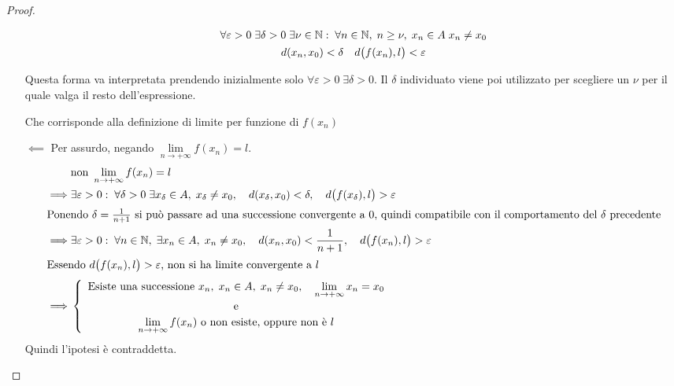 \begin{proposition}
\begin{proof}
\begin{itemize}
				\begin{equation*}
					\begin{gathered}
						\forall \varepsilon > 0\; \exists \delta > 0\; \exists \nu \in \mathbb{N}:\; \forall n \in \mathbb{N},\; n \geq \nu,\; x_n \in A\; x_n \neq x_0\\
						d(x_n, x_0) < \delta \quad d\bigl(f(x_n), l\bigr) < \varepsilon
					\end{gathered}
				\end{equation*}
				\begin{note}
					Questa forma va interpretata prendendo inizialmente solo $\forall \varepsilon > 0\; \exists \delta > 0$. Il $\delta$ individuato viene poi utilizzato per scegliere un $\nu$ per il quale valga il resto dell'espressione.
				\end{note}
				Che corrisponde alla definizione di limite per funzione di $f(x_n)$
			\item[$\impliedby$] Per assurdo, negando $\lim\limits_{n \to +\infty} f(x_n) = l$.
				\begin{align*}
					&\text{non } \lim\limits_{n \to +\infty} f(x_n) = l\\
					\implies & \exists \varepsilon > 0:\; \forall \delta > 0\; \exists x_\delta \in A,\; x_\delta \neq x_0, \quad d(x_\delta, x_0) < \delta, \quad d \bigl( f(x_\delta), l \bigr) > \varepsilon\\
					\intertext{Ponendo $\delta = \frac{1}{n+1}$ si può passare ad una successione convergente a $0$, quindi compatibile con il comportamento del $\delta$ precedente}
					\implies & \exists \varepsilon > 0:\; \forall n \in \mathbb{N},\; \exists x_n \in A,\; x_n \neq x_0, \quad d(x_n, x_0) < \frac{1}{n+1}, \quad d \bigl( f(x_n), l \bigr) > \varepsilon\\
					\intertext{Essendo $d \bigl( f(x_n), l \bigr) > \varepsilon$, non si ha limite convergente a $l$}
					\implies & \begin{cases}
						\begin{array}{c}
							\text{Esiste una successione } x_n,\; x_n \in A,\; x_n \neq x_0, \quad \lim\limits_{n \to +\infty} x_n = x_0\\
							\text{e}\\
							\lim\limits_{n \to +\infty} f(x_n) \text{ o non esiste, oppure non è } l
						\end{array}
					\end{cases}
				\end{align*}
				Quindi l'ipotesi è contraddetta.
		\end{itemize}
	\end{proof}
\end{proposition}

